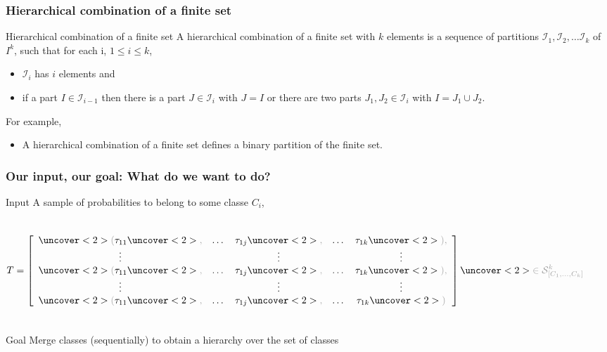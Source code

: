 \begin{frame}[t]
\frametitle{Hierarchical combination of a finite set}
\begin{block}{Hierarchical combination of a finite set}
A hierarchical combination of a finite set with $k$ elements is a sequence of partitions $\mathcal{I}_1, \mathcal{I}_2, \dots \mathcal{I}_k$ of $I^k$, such that for each i, $1 \leq i \leq k$,
\begin{itemize}
\item $\mathcal{I}_i$ has $i$ elements and
\item if a part $I \in \mathcal{I}_{i-1}$ then there is a part $J \in \mathcal{I}_i$ with $J = I$ or there are two parts $J_1, J_2 \in \mathcal{I}_i$ with $I = J_1 \cup J_2$.
\end{itemize}
\end{block}

For example,
\begin{itemize}
\item A hierarchical combination of a finite set defines a binary partition of the finite set.
\end{itemize}

\end{frame}

\begin{frame}[t]
\frametitle{Our input, our goal: What do we want to do?}

\begin{block}{Input}
A sample of probabilities to belong to some classe $C_i$, 
\begin{columns}
\[ T = \left[ \begin{array}{ccccc}
\idea{(}\tau_{11}\idea{,} & \dots & \tau_{1j}\idea{,} & \dots & \tau_{1k}\idea{),} \\
\vdots      & &    \vdots                     & &    \vdots                     \\
\idea{(}\tau_{11}\idea{,} & \dots & \tau_{1j}\idea{,} & \dots & \tau_{1k}\idea{),} \\
\vdots      & &      \vdots                   & &       \vdots                  \\
\idea{(}\tau_{11}\idea{,} & \dots & \tau_{1j}\idea{,} & \dots & \tau_{1k}\idea{)}
\end{array} \right] 
\idea{ \in \mathcal{S}_{[C_1,\dots,C_k]}^k } \]
\end{columns}
\end{block}

\pause
\begin{alertblock}{Goal}
\alert{Merge} classes (sequentially) to obtain a hierarchy over the set of classes %
\end{alertblock}
\end{frame}




